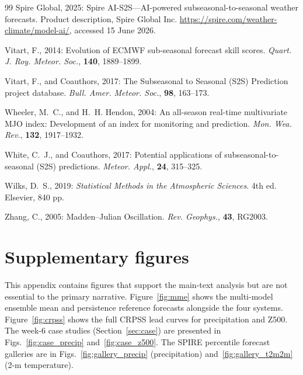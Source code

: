 \documentclass[11pt,a4paper]{article}
\begin{document}
\begin{thebibliography}{99}
Spire Global, 2025: Spire AI-S2S---AI-powered subseasonal-to-seasonal
weather forecasts. Product description, Spire Global Inc.
\url{https://spire.com/weather-climate/model-ai/}, accessed 15 June 2026.

Vitart, F., 2014: Evolution of ECMWF sub-seasonal forecast skill
scores. \textit{Quart. J. Roy. Meteor. Soc.}, \textbf{140},
1889--1899.

Vitart, F., and Coauthors, 2017: The Subseasonal to Seasonal (S2S)
Prediction project database. \textit{Bull. Amer. Meteor. Soc.},
\textbf{98}, 163--173.

Wheeler, M.~C., and H.~H. Hendon, 2004: An all-season real-time
multivariate MJO index: Development of an index for monitoring and
prediction. \textit{Mon. Wea. Rev.}, \textbf{132}, 1917--1932.

White, C.~J., and Coauthors, 2017: Potential applications of
subseasonal-to-seasonal (S2S) predictions. \textit{Meteor. Appl.},
\textbf{24}, 315--325.

Wilks, D.~S., 2019: \textit{Statistical Methods in the Atmospheric
Sciences}. 4th ed. Elsevier, 840 pp.

Zhang, C., 2005: Madden--Julian Oscillation. \textit{Rev. Geophys.},
\textbf{43}, RG2003.

\end{thebibliography}

\appendix
\section{Supplementary figures}\label{app:supp}

This appendix contains figures that support the main-text analysis but are
not essential to the primary narrative. Figure~\ref{fig:mme} shows the
multi-model ensemble mean and persistence reference forecasts alongside
the four systems. Figure~\ref{fig:crpss} shows the full CRPSS lead curves
for precipitation and Z500. The week-6 case studies (Section~\ref{sec:case})
are presented in Figs.~\ref{fig:case_precip} and~\ref{fig:case_z500}.
The SPIRE percentile forecast galleries are in
Figs.~\ref{fig:gallery_precip} (precipitation) and~\ref{fig:gallery_t2m2m}
(2-m temperature).
\end{document}
